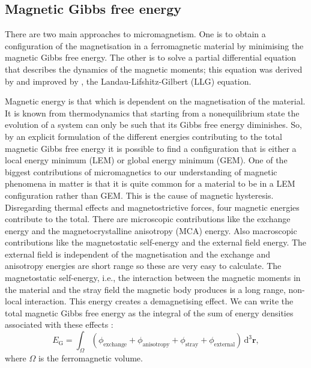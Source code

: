 \subsection{Magnetic Gibbs free energy}
There are two main approaches to micromagnetism. One is to obtain a configuration of the magnetisation in a ferromagnetic material by minimising the magnetic Gibbs free energy. The other is to solve a partial differential equation that describes the dynamics of the magnetic moments; this equation was derived by \citet{Landau1935} and improved by \citet{Gilbert2004}, the Landau-Lifshitz-Gilbert (LLG) equation.\par

Magnetic energy is that which is dependent on the magnetisation of the material. It is known from thermodynamics that starting from a nonequilibrium state the evolution of a system can only be such that its Gibbs free energy diminishes. So, by an explicit formulation of the different energies contributing to the total magnetic Gibbs free energy it is possible to find a configuration that is either a local energy minimum (LEM) or global energy minimum (GEM). One of the biggest contributions of micromagnetics to our understanding of magnetic phenomena in matter is that it is quite common for a material to be in a LEM configuration rather than GEM. This is the cause of magnetic hysteresis. Disregarding thermal effects and magnetostrictive forces, four magnetic energies contribute to the total. There are microscopic contributions like the exchange energy and the magnetocrystalline anisotropy (MCA) energy. Also macroscopic contributions like the magnetostatic self-energy and the external field energy. The external field is independent of the magnetisation and the exchange and anisotropy energies are short range so these are very easy to calculate. The magnetostatic self-energy, i.e., the interaction between the magnetic moments in the material and the stray field the magnetic body produces is a long range, non-local interaction. This energy creates a demagnetising effect. We can write the total magnetic Gibbs free energy as the integral of the sum of energy densities associated with these effects \citep{Brown}:
\begin{equation}\label{gibbs0}
E_{\text{G}} = \int_{\Omega} (\phi_{\text{exchange}} + \phi_{\text{anisotropy}} + \phi_{\text{stray}} + \phi_{\text{external}})\, \text{d}^3\boldsymbol{r},
\end{equation}
where $\Omega$ is the ferromagnetic volume.\par

